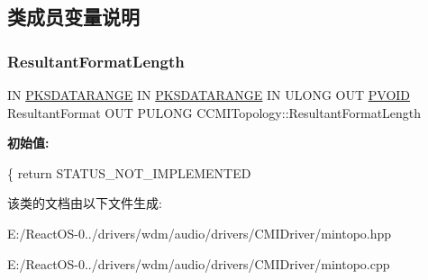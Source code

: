 \subsection{类成员变量说明}
\mbox{\label{class_c_c_m_i_topology_ab99d28c5d8d70046bbdcd1675fd31c0a}} 
\subsubsection{\texorpdfstring{Resultant\+Format\+Length}{ResultantFormatLength}}
{\footnotesize\ttfamily IN \hyperlink{struct_k_s_d_a_t_a_f_o_r_m_a_t}{P\+K\+S\+D\+A\+T\+A\+R\+A\+N\+GE} IN \hyperlink{struct_k_s_d_a_t_a_f_o_r_m_a_t}{P\+K\+S\+D\+A\+T\+A\+R\+A\+N\+GE} IN U\+L\+O\+NG O\+UT \hyperlink{interfacevoid}{P\+V\+O\+ID} Resultant\+Format O\+UT P\+U\+L\+O\+NG C\+C\+M\+I\+Topology\+::\+Resultant\+Format\+Length}

{\bfseries 初始值\+:}
\begin{DoxyCode}
\{
        \textcolor{keywordflow}{return} STATUS\_NOT\_IMPLEMENTED
\end{DoxyCode}


该类的文档由以下文件生成\+:\begin{DoxyCompactItemize}
\item 
E\+:/\+React\+O\+S-\/0../drivers/wdm/audio/drivers/\+C\+M\+I\+Driver/mintopo.\+hpp\item 
E\+:/\+React\+O\+S-\/0../drivers/wdm/audio/drivers/\+C\+M\+I\+Driver/mintopo.\+cpp\end{DoxyCompactItemize}
